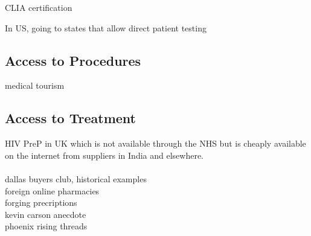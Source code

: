 \documentclass{article}
\begin{document}
CLIA certification



In US, going to states that allow direct patient testing

\subsection{Access to Procedures}

medical tourism\\



\subsection{Access to Treatment}

HIV PreP in UK which is not available through the NHS but is cheaply available on the internet from suppliers in India and elsewhere.\\


\cite{wilson2017}\\

dallas buyers club, historical examples\\
foreign online pharmacies\\
forging precriptions\\
kevin carson anecdote\\
phoenix rising threads\\
\end{document}
